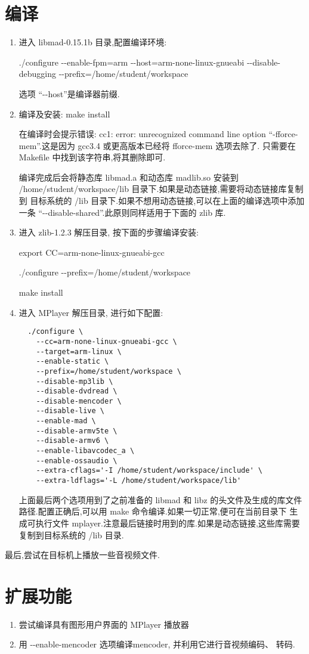 \section{编译}
\begin{enumerate}
  \item 进入 libmad-0.15.1b 目录,配置编译环境:

	./configure -{}-enable-fpm=arm -{}-host=arm-none-linux-gnueabi
	-{}-disable-debugging -{}-prefix=/home/student/workspace

	选项 ``-{}-host''是编译器前缀.

  \item 编译及安装:  make install

	在编译时会提示错误: cc1: error: unrecognized command line option
	``-fforce-mem''.这是因为 gcc3.4 或更高版本已经将 fforce-mem 选项去除了.
	只需要在 Makefile 中找到该字符串,将其删除即可.

	编译完成后会将静态库 libmad.a 和动态库 madlib.so 安装到
	/home/student/workspace/lib 目录下.如果是动态链接,需要将动态链接库复制到
	目标系统的 /lib 目录下.如果不想用动态链接,可以在上面的编译选项中添加
	一条 ``-{}-disable-shared''.此原则同样适用于下面的 zlib 库.

  \item 进入 zlib-1.2.3 解压目录, 按下面的步骤编译安装:

	export CC=arm-none-linux-gnueabi-gcc

	./configure -{}-prefix=/home/student/workspace

	make install

  \item 进入 MPlayer 解压目录, 进行如下配置:
\begin{verbatim}
  ./configure \
    --cc=arm-none-linux-gnueabi-gcc \
    --target=arm-linux \
    --enable-static \
    --prefix=/home/student/workspace \
    --disable-mp3lib \
    --disable-dvdread \
    --disable-mencoder \
    --disable-live \
    --enable-mad \
    --disable-armv5te \
    --disable-armv6 \
    --enable-libavcodec_a \
    --enable-ossaudio \
    --extra-cflags='-I /home/student/workspace/include' \
    --extra-ldflags='-L /home/student/workspace/lib'
    \end{verbatim}
	上面最后两个选项用到了之前准备的 libmad 和 libz 的头文件及生成的库文件
	路径.配置正确后,可以用 make 命令编译.如果一切正常,便可在当前目录下
	生成可执行文件 mplayer.注意最后链接时用到的库.如果是动态链接,这些库需要
	复制到目标系统的 /lib 目录.
\end{enumerate}

	最后,尝试在目标机上播放一些音视频文件.

\section{扩展功能}
\begin{enumerate}
  \item 尝试编译具有图形用户界面的 MPlayer 播放器
  \item 用 -{}-enable-mencoder 选项编译mencoder, 并利用它进行音视频编码、
	转码.
\end{enumerate}
